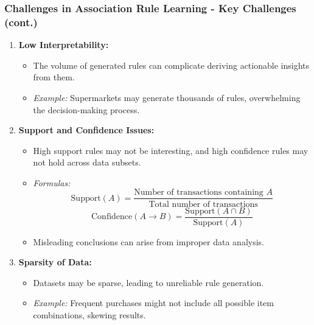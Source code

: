 \documentclass[aspectratio=169]{beamer}
\begin{document}
\begin{frame}[fragile]
    \frametitle{Challenges in Association Rule Learning - Key Challenges (cont.)}
    \begin{enumerate}[resume]
        \item \textbf{Low Interpretability:}
        \begin{itemize}
            \item The volume of generated rules can complicate deriving actionable insights from them.
            \item \textit{Example:} Supermarkets may generate thousands of rules, overwhelming the decision-making process.
        \end{itemize}
        
        \item \textbf{Support and Confidence Issues:}
        \begin{itemize}
            \item High support rules may not be interesting, and high confidence rules may not hold across data subsets.
            \item \textit{Formulas:}
                \begin{equation}
                \text{Support}(A) = \frac{\text{Number of transactions containing } A}{\text{Total number of transactions}}
                \end{equation}
                \begin{equation}
                \text{Confidence}(A \rightarrow B) = \frac{\text{Support}(A \cap B)}{\text{Support}(A)}
                \end{equation}
            \item Misleading conclusions can arise from improper data analysis.
        \end{itemize}
        
        \item \textbf{Sparsity of Data:}
        \begin{itemize}
            \item Datasets may be sparse, leading to unreliable rule generation.
            \item \textit{Example:} Frequent purchases might not include all possible item combinations, skewing results.
        \end{itemize}
    \end{enumerate}
\end{frame}
\end{document}
